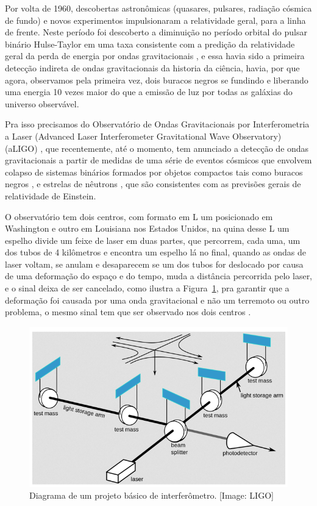 Por volta de 1960, descobertas astronômicas (quasares, pulsares, radiação cósmica de fundo) e novos experimentos impulsionaram a relatividade geral, para a linha de frente. Neste período foi descoberto a diminuição no período orbital do pulsar binário Hulse-Taylor em uma taxa consistente com a predição da relatividade geral da perda de energia por ondas gravitacionais \cite{weisberg2004relativistic}, e essa havia sido a primeira detecção indireta de ondas gravitacionais da historia da ciência, havia, por que agora, observamos pela primeira vez, dois buracos negros se fundindo e liberando uma energia 10 vezes maior do que a emissão de luz por todas as galáxias do universo observável. 

Pra isso precisamos do Observatório de Ondas Gravitacionais por Interferometria a Laser (Advanced Laser Interferometer Gravitational Wave Observatory) (aLIGO) \cite{PhysRevLett.116.131103,0264-9381-32-7-074001}, que recentemente, até o momento, tem anunciado a detecção de ondas gravitacionais a partir de medidas de uma série de eventos cósmicos que envolvem colapso de sistemas binários formados por objetos compactos tais como buracos negros \cite{abbott2016observation,ligo2016gw151226,scientific2017gw170104,abbott2017gw170814}, e estrelas de nêutrons \cite{abbott2017gw170817}, que são consistentes com as previsões gerais de relatividade de Einstein.

O observatório tem dois centros, com formato em L um posicionado em Washington e outro em Louisiana nos Estados Unidos, na quina desse L um espelho divide um feixe de laser em duas partes, que percorrem, cada uma, um dos tubos de 4 kilômetros e encontra um espelho lá no final, quando as ondas de laser voltam, se anulam e desaparecem se um dos tubos for deslocado por causa de uma deformação do espaço e do tempo, muda a distância percorrida pelo laser, e o sinal deixa de ser cancelado, como ilustra a Figura~\ref{figinterferometer}, pra garantir que a deformação foi causada por uma onda gravitacional e não um terremoto ou outro problema, o mesmo sinal tem que ser observado nos dois centros \cite{PhysRevLett.116.131103}. 

\begin{figure}[ht]
\centering
\includegraphics[width=1\textwidth]{figuras/interferometro.png}
\caption{Diagrama de um projeto básico de interferômetro. [Image: LIGO]}
\label{figinterferometer}
\end{figure}
 
